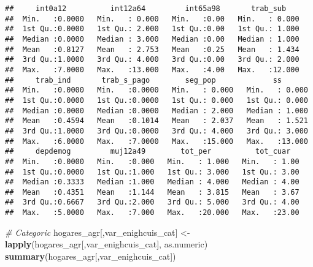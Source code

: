 \documentclass[11pt,]{article}
\newenvironment{Shaded}{\begin{snugshade}}{\end{snugshade}}
\newcommand{\KeywordTok}[1]{\textcolor[rgb]{0.13,0.29,0.53}{\textbf{#1}}}
\newcommand{\StringTok}[1]{\textcolor[rgb]{0.31,0.60,0.02}{#1}}
\newcommand{\CommentTok}[1]{\textcolor[rgb]{0.56,0.35,0.01}{\textit{#1}}}
\newcommand{\NormalTok}[1]{#1}
\begin{document}
\begin{verbatim}
##     int0a12          int12a64         int65a98       trab_sub     
##  Min.   :0.0000   Min.   : 0.000   Min.   :0.00   Min.   : 0.000  
##  1st Qu.:0.0000   1st Qu.: 2.000   1st Qu.:0.00   1st Qu.: 1.000  
##  Median :0.0000   Median : 3.000   Median :0.00   Median : 1.000  
##  Mean   :0.8127   Mean   : 2.753   Mean   :0.25   Mean   : 1.434  
##  3rd Qu.:1.0000   3rd Qu.: 4.000   3rd Qu.:0.00   3rd Qu.: 2.000  
##  Max.   :7.0000   Max.   :13.000   Max.   :4.00   Max.   :12.000  
##     trab_ind       trab_s_pago        seg_pop             ss        
##  Min.   :0.0000   Min.   :0.0000   Min.   : 0.000   Min.   : 0.000  
##  1st Qu.:0.0000   1st Qu.:0.0000   1st Qu.: 0.000   1st Qu.: 0.000  
##  Median :0.0000   Median :0.0000   Median : 2.000   Median : 1.000  
##  Mean   :0.4594   Mean   :0.1014   Mean   : 2.037   Mean   : 1.521  
##  3rd Qu.:1.0000   3rd Qu.:0.0000   3rd Qu.: 4.000   3rd Qu.: 3.000  
##  Max.   :6.0000   Max.   :7.0000   Max.   :15.000   Max.   :13.000  
##     depdemog         muj12a49        tot_per          tot_cuar    
##  Min.   :0.0000   Min.   :0.000   Min.   : 1.000   Min.   : 1.00  
##  1st Qu.:0.0000   1st Qu.:1.000   1st Qu.: 3.000   1st Qu.: 3.00  
##  Median :0.3333   Median :1.000   Median : 4.000   Median : 4.00  
##  Mean   :0.4351   Mean   :1.144   Mean   : 3.815   Mean   : 3.67  
##  3rd Qu.:0.6667   3rd Qu.:2.000   3rd Qu.: 5.000   3rd Qu.: 4.00  
##  Max.   :5.0000   Max.   :7.000   Max.   :20.000   Max.   :23.00
\end{verbatim}

\begin{Shaded}
\begin{Highlighting}[]
\CommentTok{# Categoric}
\NormalTok{hogares_agr[,var_enighcuis_cat] <-}\StringTok{ }\KeywordTok{lapply}\NormalTok{(hogares_agr[,var_enighcuis_cat],}
\NormalTok{                                          as.numeric)}
\KeywordTok{summary}\NormalTok{(hogares_agr[,var_enighcuis_cat])}
\end{Highlighting}
\end{Shaded}
\end{document}
